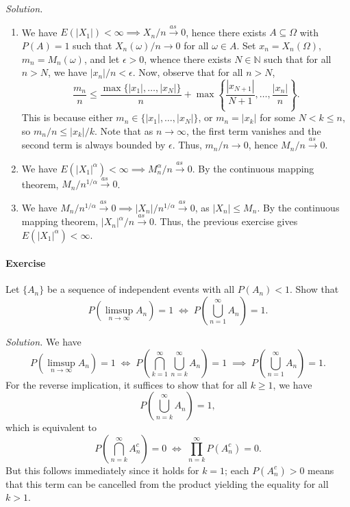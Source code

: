 \documentclass[10pt]{article}
\newcounter{prob}
\newcommand{\problem}{\stepcounter{prob}\paragraph{Exercise \arabic{prob}}}
\newcommand{\solution}{\textit{Solution.} }
\newcommand{\N}{\mathbb{N}}
\newcommand{\toas}{\overset{as\,}{\longrightarrow}}
\begin{document}
    \solution \begin{enumerate}
        \item We have $E(|X_1|) < \infty \implies X_n/n \toas 0$, hence there exists
        $A \subseteq \Omega$ with $P(A) = 1$ such that $X_n(\omega) / n \to 0$ 
        for all $\omega \in A$. Set $x_n = X_n(\Omega)$, $m_n = M_n(\omega)$, and let
        $\epsilon > 0$, whence there exists $N \in \N$ such that for all $n > N$,
        we have $|x_n|/n < \epsilon$. Now, observe that for all $n > N$, \[
            \frac{m_n}{n} \leq \frac{\max\{|x_1|, \dots, |x_N|\}}{n} +
            \max\left\{\frac{|x_{N + 1}|}{N + 1}, \dots, \frac{|x_n|}{n}\right\}.
        \] This is because either $m_n \in \{|x_1|, \dots, |x_N|\}$, or $m_n = |x_k|$
        for some $N < k \leq n$, so $m_n / n \leq |x_k| / k$. Note that as $n \to
        \infty$, the first term vanishes and the second term is always bounded by
        $\epsilon$. Thus, $m_n / n \to 0$, hence $M_n/n \toas 0$.

        \item We have $E(|X_1|^\alpha) < \infty \implies M_n^\alpha / n \toas 0$. By
        the continuous mapping theorem, $M_n / n^{1/\alpha} \toas 0$.

        \item We have $M_n / n^{1/\alpha} \toas 0 \implies |X_n|/n^{1/\alpha} \toas 0$,
        as $|X_n| \leq M_n$. By the continuous mapping theorem, $|X_n|^\alpha/n \toas
        0$. Thus, the previous exercise gives $E(|X_1|^\alpha) < \infty$.
    \end{enumerate}


    \problem Let $\{A_n\}$ be a sequence of independent events with all $P(A_n) < 1$.
    Show that \[
        P(\limsup_{n \to \infty} A_n) = 1 \;\iff\; P\left(\bigcup_{n = 1}^\infty
        A_n\right) = 1.
    \]

    \solution We have \[
        P(\limsup_{n \to \infty} A_n) = 1 \;\iff\; P\left(\bigcap_{k = 1}^\infty
        \bigcup_{n = k}^\infty A_n\right) = 1 \;\implies\; P\left(\bigcup_{n =
        1}^\infty A_n\right) = 1.
    \] For the reverse implication, it suffices to show that for all $k \geq 1$, we
    have \[
        P\left(\bigcup_{n = k}^\infty A_n\right) = 1,
    \] which is equivalent to \[
        P\left(\bigcap_{n = k}^\infty A_n^c\right) = 0 \;\iff\;
        \prod_{n = k}^\infty P(A_n^c) = 0.
    \] But this follows immediately since it holds for $k = 1$; each $P(A_n^c) > 0$
    means that this term can be cancelled from the product yielding the equality for
    all $k > 1$.
\end{document}
